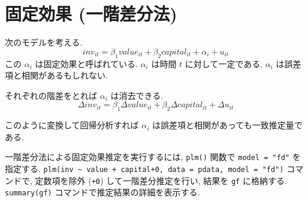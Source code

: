 \documentclass[
  letterpaper,
  xelatex,
  ja=standard, xelatex]{bxjsbook}
\begin{document}
\section{固定効果
(一階差分法)}\label{ux56faux5b9aux52b9ux679c-ux4e00ux968eux5deeux5206ux6cd5}

次のモデルを考える. \[
inv_{it} = \beta_1 value_{it} + \beta_2 capital_{it} +\alpha_i + u_{it}
\] この \(\alpha_i\) は固定効果と呼ばれている. \(\alpha_i\) は時間 \(t\)
に対して一定である. \(\alpha_i\) は誤差項と相関があるもしれない.

それぞれの階差をとれば \(\alpha_i\) は消去できる. \[
\Delta inv_{it} = \beta_1 \Delta value_{it} + \beta_2 \Delta capital_{it} + \Delta u_{it}
\]

このように変換して回帰分析すれば \(\alpha_i\)
は誤差項と相関があっても一致推定量である.

一階差分法による固定効果推定を実行するには, \texttt{plm()} 関数で
\texttt{model\ =\ "fd"} を指定する.
\texttt{plm(inv\ \textasciitilde{}\ value\ +\ capital+0,\ data\ =\ pdata,\ model\ =\ "fd")}
コマンドで, 定数項を除外 (\texttt{+0}) して一階差分推定を行い, 結果を
\texttt{gf} に格納する. \texttt{summary(gf)}
コマンドで推定結果の詳細を表示する.
\end{document}
